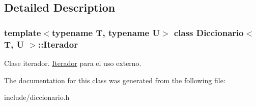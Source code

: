 \subsection{Detailed Description}
\subsubsection*{template$<$typename T, typename U$>$\newline
class Diccionario$<$ T, U $>$\+::\+Iterador}

Clase iterador. \hyperlink{classDiccionario_1_1Iterador}{Iterador} para el uso externo. 

The documentation for this class was generated from the following file\+:\begin{DoxyCompactItemize}
\item 
include/diccionario.\+h\end{DoxyCompactItemize}
